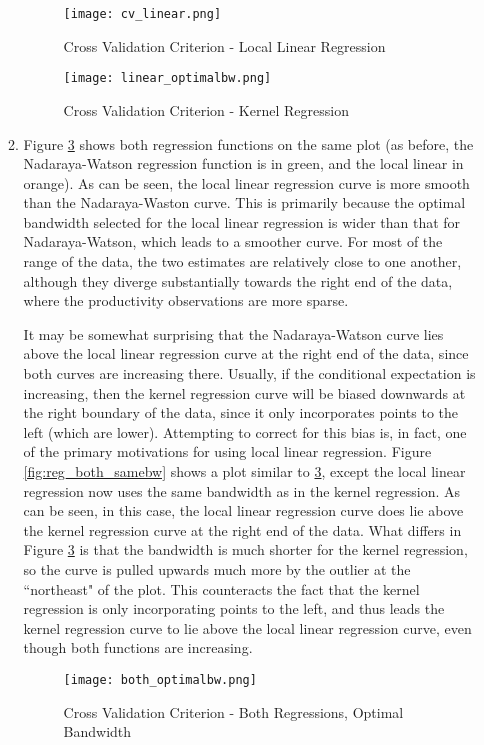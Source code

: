 \documentclass[]{report}
\newcommand{\0}{\bv{0}}
\newcommand{\1}{\bv{1}}
\begin{document}
\begin{enumerate}[1.]
\begin{enumerate}
\begin{figure}[hbtp]
	\begin{center}
		\caption{Cross Validation Criterion - Local Linear Regression}
		\label{fig:cv_linear}
		\texttt{[image: cv\_linear.png]}
	\end{center}
\end{figure}


\begin{figure}[hbtp]
	\begin{center}
		\caption{Cross Validation Criterion - Kernel Regression}
		\label{fig:reg_linear}
		\texttt{[image: linear\_optimalbw.png]}
	\end{center}
\end{figure}


\item

Figure \ref{fig:reg_both} shows both regression functions on the same plot (as before, the Nadaraya-Watson regression function is in green, and the local linear in orange). As can be seen, the local linear regression curve is more smooth than the Nadaraya-Waston curve. This is primarily because the optimal bandwidth selected for the local linear regression is wider than that for Nadaraya-Watson, which leads to a smoother curve.  For most of the range of the data, the two estimates are relatively close to one another, although they diverge substantially towards the right end of the data, where the productivity observations are more sparse. 

It may be somewhat surprising that the Nadaraya-Watson curve lies above the local linear regression curve at the right end of the data, since both curves are increasing there. Usually, if the conditional expectation is increasing, then the kernel regression curve will be biased downwards at the right boundary of the data, since it only incorporates points to the left (which are lower). Attempting to correct for this bias is, in fact, one of the primary motivations for using local linear regression. Figure \ref{fig:reg_both_samebw} shows a plot similar to \ref{fig:reg_both}, except the local linear regression now uses the same bandwidth as in the kernel regression. As can be seen, in this case, the local linear regression curve does lie above the kernel regression curve at the right end of the data. What differs in Figure \ref{fig:reg_both} is that the bandwidth is much shorter for the kernel regression, so the curve is pulled upwards much more by the outlier at the ``northeast" of the plot. This counteracts the fact that the kernel regression is only incorporating points to the left, and thus leads the kernel regression curve to lie above the local linear regression curve, even though both functions are increasing.
\begin{figure}[hbtp]
	\begin{center}
		\caption{Cross Validation Criterion - Both Regressions, Optimal Bandwidth}
		\label{fig:reg_both}
		\texttt{[image: both\_optimalbw.png]}
	\end{center}
\end{figure}


\end{enumerate}
\end{enumerate}
\end{document}
